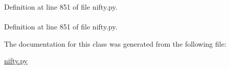 \-Definition at line 851 of file nifty.\-py.

\hypertarget{classforcebalance_1_1nifty_1_1LineChunker_a96901fd1a8b40b5694070de7b45f1a1c}{
\paragraph[{callback}]{}}\label{classforcebalance_1_1nifty_1_1LineChunker_a96901fd1a8b40b5694070de7b45f1a1c}


\-Definition at line 851 of file nifty.\-py.



\-The documentation for this class was generated from the following file\-:\begin{DoxyCompactItemize}
\item 
\hyperlink{nifty_8py}{nifty.\-py}\end{DoxyCompactItemize}
